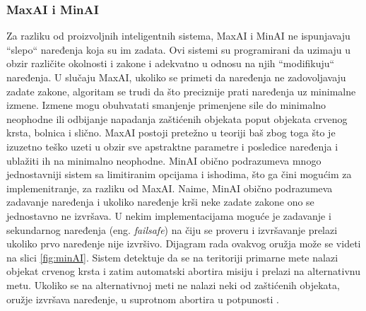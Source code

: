 \documentclass[a4paper]{article}
\begin{document}
\subsubsection{MaxAI i MinAI}
\label{subsubsec: MaxAI i MinAI}
Za razliku od proizvoljnih inteligentnih sistema, MaxAI i MinAI ne ispunjavaju ``slepo`` naređenja koja su im zadata. Ovi sistemi su programirani da uzimaju u obzir različite okolnosti i zakone i adekvatno u odnosu na njih ``modifikuju`` naređenja.
U slučaju MaxAI, ukoliko se primeti da naređenja ne zadovoljavaju zadate zakone, algoritam se trudi da što preciznije prati naređenja uz minimalne izmene. Izmene mogu obuhvatati smanjenje primenjene sile do minimalno neophodne ili odbijanje napadanja zaštićenih objekata poput objekata crvenog krsta, bolnica i slično. MaxAI postoji pretežno u teoriji baš zbog toga što je izuzetno teško uzeti u obzir sve apstraktne parametre i posledice naređenja i ublažiti ih na minimalno neophodne.
MinAI obično podrazumeva mnogo jednostavniji sistem sa limitiranim opcijama i ishodima, što ga čini mogućim za implemenitranje, za razliku od MaxAI. Naime, MinAI obično podrazumeva zadavanje naređenja i ukoliko naređenje krši neke zadate zakone ono se jednostavno ne izvršava. U nekim implementacijama moguće je zadavanje i sekundarnog naređenja (eng. \textit{failsafe}) na čiju se proveru i izvršavanje prelazi ukoliko prvo naređenje nije izvršivo. Dijagram rada ovakvog oružja može se videti na slici \ref{fig:minAI}. Sistem detektuje da se na teritoriji primarne mete nalazi objekat crvenog krsta i zatim automatski abortira misiju i prelazi na alternativnu metu. Ukoliko se na alternativnoj meti ne nalazi neki od zaštićenih objekata, oružje izvršava naređenje, u suprotnom abortira u potpunosti \cite[Chapter 36]{oxford_knjiga}.
\end{document}
